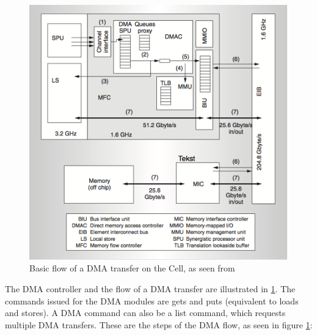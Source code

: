\begin{figure}[htb]
    \centering
    \includegraphics[width=1\textwidth]{Figures/DMA/CellDMA}
    \caption{Basic flow of a DMA transfer on the Cell, as seen from \cite{cell}}
    \label{fig:CellDMA}
\end{figure}

The DMA controller and the flow of a DMA transfer are illustrated in \ref{fig:CellDMA}.
The commands issued for the DMA modules are gets and puts (equivalent to loads and stores).
A DMA command can also be a list command, which requests multiple DMA transfers.
These are the steps of the DMA flow, as seen in figure \ref{fig:CellDMA}:

